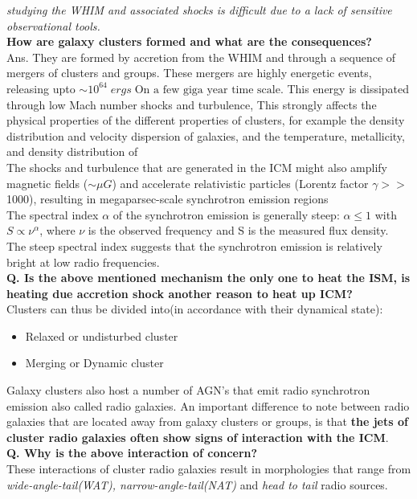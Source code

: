 \documentclass[11pt]{report}
\begin{document}
\textit{studying the WHIM and associated shocks is difficult due to a lack of sensitive observational tools.}\\
\textbf{How are galaxy clusters formed and what are the consequences?}\\
Ans. They are formed by accretion from the WHIM and through a sequence of mergers of clusters and groups. These mergers are highly energetic events, releasing upto $\sim 10^{64} \; ergs\; \text{On a few giga year time scale}$. This energy is dissipated through low Mach number shocks and turbulence,  This strongly affects the physical properties of the different properties of clusters, for example the density distribution and velocity dispersion of galaxies, and the temperature, metallicity, and density distribution of \\
 The shocks and turbulence that are generated in the ICM might also amplify magnetic fields ($\sim \mu G$) and accelerate relativistic particles (Lorentz factor $\gamma >>$  1000), resulting in megaparsec-scale synchrotron emission regions\\
  The spectral index $\alpha$ of the synchrotron emission is generally steep: $\alpha \leq 1$ with $S \propto \nu^\alpha$, where $\nu$ is the observed frequency and S is the measured flux density. The steep spectral index suggests that the synchrotron emission is relatively bright at low radio frequencies. \\
 
\textbf{Q. Is the above mentioned mechanism the only one to heat the ISM, is heating due accretion shock another reason to heat up ICM?}\\
Clusters can thus be divided into(in accordance with their dynamical state):
\begin{itemize}
\item Relaxed or undisturbed cluster
\item Merging or Dynamic cluster
\end{itemize}
Galaxy clusters also host a number of AGN's that emit radio synchrotron emission also called radio galaxies. An important difference to note between radio galaxies that are located away from galaxy clusters or groups, is that \textbf{ the jets of cluster radio galaxies often show signs of interaction with the ICM}.\\
\textbf{Q. Why is the above interaction of concern?}\\
These interactions of cluster radio galaxies result in morphologies that range from \textit{wide-angle-tail(WAT), narrow-angle-tail(NAT)} and \textit{head to tail} radio sources.
\end{document}

